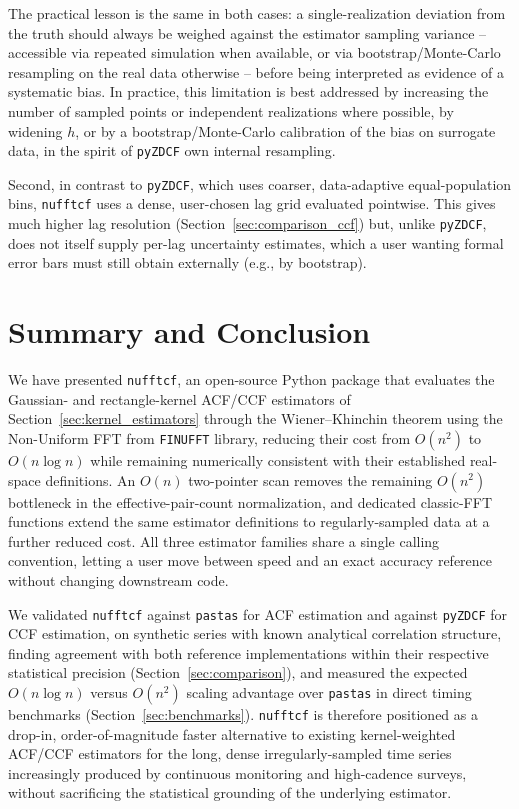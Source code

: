 \documentclass[twocolumn,10pt]{article}
\newcommand{\nufftcf}{\texttt{nufftcf}\xspace}
\newcommand{\pastas}{\texttt{pastas}\xspace}
\newcommand{\pyzdcf}{\texttt{pyZDCF}\xspace}
\begin{document}
The
practical lesson is the same in both cases: a single-realization deviation
from the truth should always be weighed against the estimator sampling
variance -- accessible via repeated simulation when available, or via
bootstrap/Monte-Carlo resampling on the real data otherwise -- before being
interpreted as evidence of a systematic bias. In practice, this limitation
is best addressed by increasing the number of sampled points or independent
realizations where possible, by widening $h$, or by a bootstrap/Monte-Carlo
calibration of the bias on surrogate data, in the spirit of \pyzdcf own
internal resampling.

Second, in contrast to \pyzdcf, which uses coarser, data-adaptive
equal-population bins, \nufftcf uses a dense, user-chosen lag grid evaluated
pointwise. This gives much higher lag resolution
(Section~\ref{sec:comparison_ccf}) but, unlike \pyzdcf, does not itself
supply per-lag uncertainty estimates, which a user wanting formal error
bars must still obtain externally (e.g., by bootstrap).
%
\section{Summary and Conclusion}
\label{sec:conclusion}
%
We have presented \nufftcf, an open-source Python package that
evaluates the Gaussian- and rectangle-kernel ACF/CCF estimators of
Section~\ref{sec:kernel_estimators} through the Wiener--Khinchin theorem
using the Non-Uniform FFT from \texttt{FINUFFT} library, reducing their cost from $O(n^2)$ to
$O(n\log n)$ while remaining numerically consistent with their
established real-space definitions. An $O(n)$ two-pointer scan removes
the remaining $O(n^2)$ bottleneck in the effective-pair-count
normalization, and dedicated classic-FFT functions extend the same
estimator definitions to regularly-sampled data at a further reduced
cost. All three estimator families share a single calling convention,
letting a user move between speed and an exact accuracy reference
without changing downstream code.

We validated \nufftcf against \pastas for ACF estimation and against
\pyzdcf for CCF estimation, on synthetic series with known analytical
correlation structure, finding agreement with both reference
implementations within their respective statistical precision
(Section~\ref{sec:comparison}), and measured the expected $O(n\log n)$
versus $O(n^2)$ scaling advantage over \pastas in direct timing
benchmarks (Section~\ref{sec:benchmarks}). \nufftcf is therefore
positioned as a drop-in, order-of-magnitude faster alternative to
existing kernel-weighted ACF/CCF estimators for the long, dense
irregularly-sampled time series increasingly produced by continuous
monitoring and high-cadence surveys, without sacrificing the
statistical grounding of the underlying estimator.
\end{document}
